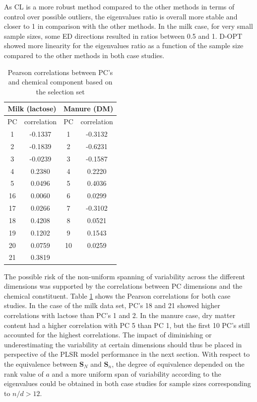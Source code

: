 \documentclass[journal=ancham,manuscript=article]{achemso}
\begin{document}
As CL is a more robust method compared to the other methods in terms of control over possible outliers, the eigenvalues ratio is overall more stable and closer to 1 in comparison with the other methods. In the milk case, for very small sample sizes, some ED directions resulted in ratios between 0.5 and 1. D-OPT showed more linearity for the eigenvalues ratio as a function of the sample size compared to the other methods in both case studies. 

\begin{table}[t]
\centering
\begin{tabular}{|cc|cc|} 
\hline
\multicolumn{2}{|c|}{Milk (lactose)} & \multicolumn{2}{|c|}{Manure (DM)}\\
\hline
PC	& correlation	&  PC & correlation	\\
\hline
  1 & -0.1337 & 1 & -0.3132 \\
  2 & -0.1839 & 2 & -0.6231 \\
  3 & -0.0239 & 3 & -0.1587 \\
  4 &  0.2380 & 4 &  0.2220 \\
  5 &  0.0496 & 5 &  0.4036 \\
 16 &  0.0060 & 6 &  0.0299 \\
 17 &  0.0266 & 7 & -0.3102 \\
 18 &  0.4208 & 8 & 0.0521 \\
 19 &  0.1202 & 9 & 0.1543 \\
 20 &  0.0759 & 10& 0.0259 \\
 21 &  0.3819 &  & \\
 \hline
\end{tabular}
\caption{Pearson correlations between PC's and chemical component based on the selection set}
\label{tab_correlations}
\end{table}

The possible risk of the non-uniform spanning of variability across the different dimensions was supported by the correlations between PC dimensions and the chemical constituent. Table \ref{tab_correlations} shows the Pearson correlations for both case studies. In the case of the milk data set, PC's 18 and 21 showed higher correlations with lactose than PC's 1 and 2. In the manure case, dry matter content had a higher correlation with PC 5 than PC 1, but the first 10 PC's still accounted for the highest correlations. The impact of diminishing or underestimating the variability at certain dimensions should thus be placed in perspective of the PLSR model performance in the next section. With respect to the equivalence between $\mathbf{S}_N$ and $\mathbf{S}_n$, the degree of equivalence depended on the rank value of $a$ and a more uniform span of variability according to the eigenvalues could be obtained in both case studies for sample sizes corresponding to $n/d>12$.  
\end{document}
